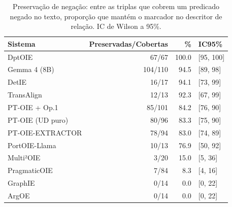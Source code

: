 \begin{table}[t]
\centering
\small
\caption{Preserva\c{c}\~ao de negação: entre as triplas que cobrem um predicado negado no texto, propor\c{c}\~ao que mant\'em o marcador no descritor de rela\c{c}\~ao. IC de Wilson a 95\%.}
\label{tab:polarity}
\begin{tabular}{l r r l}
\toprule
Sistema & Preservadas/Cobertas & \% & IC95\% \\
\midrule
DptOIE & 67/67 & 100.0 & [95, 100] \\
Gemma 4 (8B) & 104/110 & 94.5 & [89, 98] \\
DetIE & 16/17 & 94.1 & [73, 99] \\
TransAlign & 12/13 & 92.3 & [67, 99] \\
PT-OIE + Op.1 & 85/101 & 84.2 & [76, 90] \\
PT-OIE (UD puro) & 80/96 & 83.3 & [75, 90] \\
PT-OIE-EXTRACTOR & 78/94 & 83.0 & [74, 89] \\
PortOIE-Llama & 10/13 & 76.9 & [50, 92] \\
Multi²OIE & 3/20 & 15.0 & [5, 36] \\
PragmaticOIE & 7/84 & 8.3 & [4, 16] \\
GraphIE & 0/14 & 0.0 & [0, 22] \\
ArgOE & 0/14 & 0.0 & [0, 22] \\
\bottomrule
\end{tabular}
\end{table}
